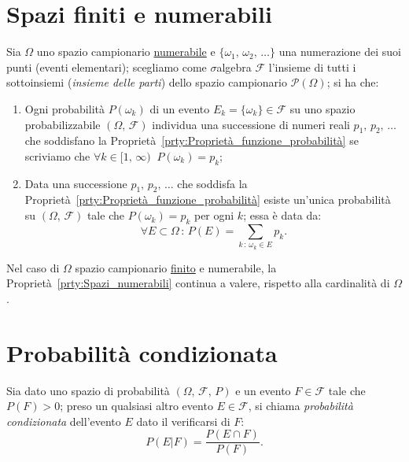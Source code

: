     \section{Spazi finiti e numerabili}
    \begin{prty}\label{prty:Spazi_numerabili}
        Sia $\Omega$ uno spazio campionario \underline{numerabile} e  $\{\omega_1,\,\omega_2,\,\ldots\}$ una numera\-zione dei suoi punti (eventi elementari); scegliamo come $\sigma$\nbdash algebra  $\mathscr{F}$ l'insieme di tutti i sottoinsiemi (\emph{insieme delle parti}) dello spazio campionario  $\mathscr{P}(\Omega)$; si ha che:
            \begin{enumerate}
                \item Ogni probabilità $P({\omega_k})$ di un evento $E_k = \{\omega_k\} \in \mathscr{F}$ su uno spazio probabiliz\-zabile $(\Omega,\,\mathscr{F})$ individua una successione di numeri reali $p_1,\,p_2,\,\ldots$ che soddisfano la Proprietà~\ref{prty:Proprietà_funzione_probabilità} se scriviamo che $\forall k \in [1,\,\infty)\,\:\,P({\omega_k}) = p_k$;
                \item Data una successione $p_1,\,p_2,\,\ldots$ che soddisfa la Proprietà~\ref{prty:Proprietà_funzione_probabilità} esiste un'unica probabilità su $(\Omega,\,\mathscr{F})$ tale che  $P({\omega_k}) = p_k$ per ogni  $k$; essa è data da: \[
                        \forall E \subset \Omega\,:\,P(E) = \sum_{k\,:\,\omega_k \in E} p_k
                .\] 
            \end{enumerate}
        \end{prty}
        \begin{obsv}
            Nel caso di $\Omega$ spazio campionario \underline{finito} e numerabile, la Proprietà~\ref{prty:Spazi_numerabili} continua a valere, rispetto alla cardinalità di $\Omega$.
        \end{obsv}
    \section{Probabilità condizionata}
    \begin{defn}\label{defn:Probabilità_condizionata}
            Sia dato uno spazio di probabilità $(\Omega,\,\mathscr{F},\,P)$ e un evento $F \in \mathscr{F}$ tale che $P(F) > 0$; preso un qualsiasi altro evento $E \in \mathscr{F}$, si chiama \emph{probabilità condizionata} dell'evento $E$ dato il verificarsi di $F$:
            \begin{equation}\label{eq:Formula_probabilità_condizionata}
                P(E|F) = \frac{P(E \cap F)}{P(F)}
            .
            \end{equation}
        \end{defn}
